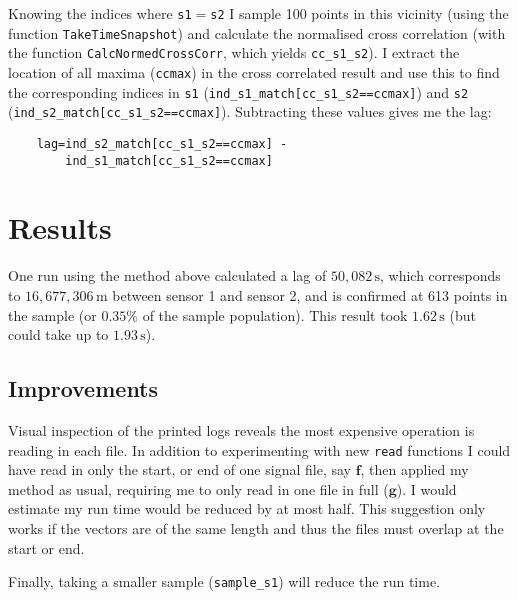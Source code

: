 \documentclass[prb,11pt,twocolumn]{revtex4-1}
\begin{document}
Knowing the indices where \texttt{s1}$=$\texttt{s2} I sample 100 points in this vicinity (using the function \texttt{TakeTimeSnapshot}) and calculate the normalised cross correlation (with the function \texttt{CalcNormedCrossCorr}, which yields \texttt{cc\_s1\_s2}). I extract the location of all maxima (\texttt{ccmax}) in the cross correlated result and use this to find the corresponding indices in \texttt{s1} (\texttt{ind\_s1\_match[cc\_s1\_s2==ccmax]}) and \texttt{s2} (\texttt{ind\_s2\_match[cc\_s1\_s2==ccmax]}). Subtracting these values gives me the lag:

\begin{verbatim}
    lag=ind_s2_match[cc_s1_s2==ccmax] -
        ind_s1_match[cc_s1_s2==ccmax]   
\end{verbatim}

\section{Results}
One run using the method above calculated a lag of $50,082\,\mathrm{s}$, which corresponds to $16,677,306\,\mathrm{m}$ between sensor 1 and sensor 2, and is confirmed at 613 points in the sample (or $0.35\%$ of the sample population). This result took $1.62\,\mathrm{s}$ (but could take up to $1.93\,\mathrm{s}$).

\subsection{Improvements}
Visual inspection of the printed logs reveals the most expensive operation is reading in each file. In addition to experimenting with new \texttt{read} functions I could have read in only the start, or end of one signal file, say $\mathbf{f}$, then applied my method as usual, requiring me to only read in one file in full ($\mathbf{g}$). I would estimate my run time would be reduced by at most half. This suggestion only works if the vectors are of the same length and thus the files must overlap at the start or end. 

Finally, taking a smaller sample (\texttt{sample\_s1}) will reduce the run time.
\end{document}
